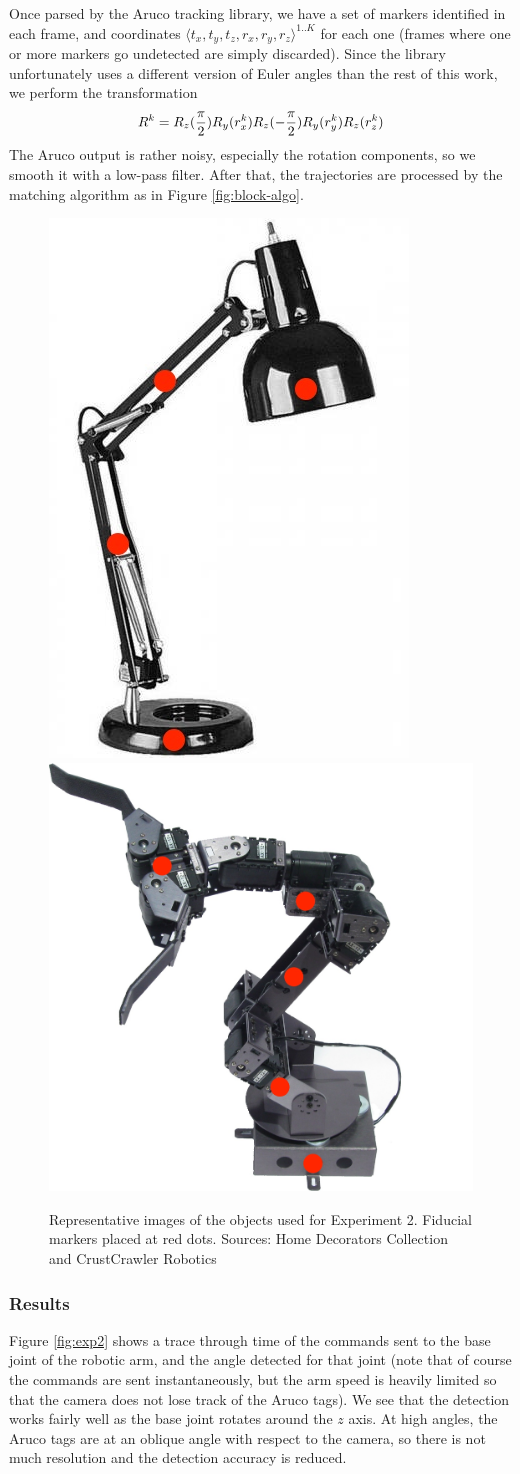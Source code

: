 \documentclass[letterpaper, 10 pt, conference]{ieeeconf}  %
\def\xmat{\uppercase}    \def\xmatstr{in uppercase}
\begin{document}
Once parsed by the Aruco tracking library, we have a set of markers identified in each frame, and coordinates $\langle t_x, t_y, t_z, r_x, r_y, r_z \rangle^{1..K}$ for each one (frames where one or more markers go undetected are simply discarded). Since the library unfortunately uses a different version of Euler angles than the rest of this work, we perform the transformation
\begin{align}
  \xmat{r}^k = R_z(\frac{\pi}{2})R_y(r_x^k)R_z(-\frac{\pi}{2})R_y(r_y^k)R_z(r_z^k)
\end{align}
The Aruco output is rather noisy, especially the rotation components, so we smooth it with a low-pass filter. After that, the trajectories are processed by the matching algorithm as in Figure \ref{fig:block-algo}.

\begin{figure}[ht]
  \centering
  \includegraphics[width=.2\textwidth]{img/lamp.jpg}
  \includegraphics[width=.27\textwidth]{img/arm.jpg}
  \caption{Representative images of the objects used for Experiment 2. Fiducial markers placed at red dots. Sources: Home Decorators Collection and CrustCrawler Robotics}
  \label{fig:lamp+arm}
\end{figure}

\subsubsection{Results}
Figure \ref{fig:exp2} shows a trace through time of the commands sent to the base joint of the robotic arm, and the angle detected for that joint (note that of course the commands are sent instantaneously, but the arm speed is heavily limited so that the camera does not lose track of the Aruco tags). We see that the detection works fairly well as the base joint rotates around the $z$ axis. At high angles, the Aruco tags are at an oblique angle with respect to the camera, so there is not much resolution and the detection accuracy is reduced.
\end{document}
